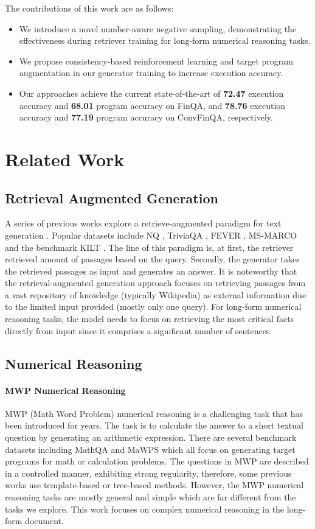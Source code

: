 \documentclass[11pt]{article}
\begin{document}
The contributions of this work are as follows:

\begin{itemize}
\item We introduce a novel number-aware negative sampling, demonstrating the effectiveness during retriever training for long-form numerical reasoning tasks.
\item We propose consistency-based reinforcement learning and target program augmentation in our generator training to increase execution accuracy.
\item Our approaches achieve the current state-of-the-art of \textbf{72.47} execution accuracy and \textbf{68.01} program accuracy on FinQA, and \textbf{78.76} execution accuracy and \textbf{77.19} program accuracy on ConvFinQA, respectively.
\end{itemize}


\section{Related Work}
\subsection{Retrieval Augmented Generation} 
A series of previous works explore a retrieve-augmented paradigm for text generation \cite{mathqa,wei2022chain,mawps,wang2022novel}.
Popular datasets include NQ \cite{nq}, TriviaQA \cite{triviaqa}, FEVER \cite{fever}, MS-MARCO \cite{ms} and the benchmark KILT \cite{kilt}. The line of this paradigm is, at first, the retriever retrieved amount of passages based on the query. Secondly, the generator takes the retrieved passages as input and generates an answer. It is noteworthy that the retrieval-augmented generation approach focuses on retrieving passages from a vast repository of knowledge (typically Wikipedia) as external information due to the limited input provided (mostly only one query). For long-form numerical reasoning tasks, the model needs to focus on retrieving the most  critical facts directly from input since it comprises a significant number of sentences.


\subsection{Numerical Reasoning} 
\paragraph{MWP Numerical Reasoning}
MWP (Math Word Problem) numerical reasoning is a challenging task that has been introduced for years. The task is to calculate the answer to a short textual question by generating an arithmetic expression. There are several benchmark datasets including MathQA \cite{mathqa} and MaWPS \cite{mawps} which all focus on generating target programs for math or calculation problems. The questions in MWP are described in a controlled manner, exhibiting strong regularity, therefore, some previous works use template-based \cite{wang2019template} or tree-based \cite{jie2022learning} methods. However, the MWP numerical reasoning tasks are mostly general and simple which are far different from the tasks we explore. This work focuses on complex numerical reasoning in the long-form document. 
\end{document}
